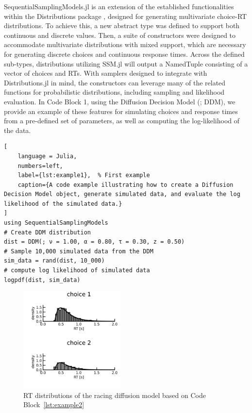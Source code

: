 \documentclass{juliacon}
\begin{document}
SequentialSamplingModels.jl is an extension of the established functionalities within the Distributions package \cite{dahua_lin_2024_13838344}, designed for generating multivariate choice-RT distributions. To achieve this, a new abstract type was defined to support both continuous and discrete values. Then, a suite of constructors were designed to accommodate multivariate distributions with mixed support, which are necessary for generating discrete choices and continuous response times. Across the defined sub-types, distributions utilizing SSM.jl will output a NamedTuple consisting of a vector of choices and RTs. With samplers designed to integrate with Distributions.jl in mind, the constructors can leverage many of the related functions for probabilistic distributions, including sampling and likelihood evaluation. In Code Block 1, using the Diffusion Decision Model (\cite{ratcliff2016diffusion}; DDM), we provide an example of these features for simulating choices and response times from a pre-defined set of parameters, as well as computing the log-likelihood of the data.
\begin{lstlisting}[
    language = Julia, 
    numbers=left, 
    label={lst:example1},  % First example
    caption={A code example illustrating how to create a Diffusion Decision Model object, generate simulated data, and evaluate the log likelihood of the simulated data.}
]
using SequentialSamplingModels
# Create DDM distribution
dist = DDM(; ν = 1.00, α = 0.80, τ = 0.30, z = 0.50)
# Sample 10,000 simulated data from the DDM
sim_data = rand(dist, 10_000)
# compute log likelihood of simulated data
logpdf(dist, sim_data)

\end{lstlisting}

\begin{figure}[!htp]
\includegraphics[height=200px,width=200px]{paper/figures/rdm_choice_rt_dists.png}
 \caption{RT distributions of the racing diffusion model based on Code Block~\ref{lst:example2}} 
 \label{fig:rdm_choice_rt_plot}
\end{figure}
\end{document}

